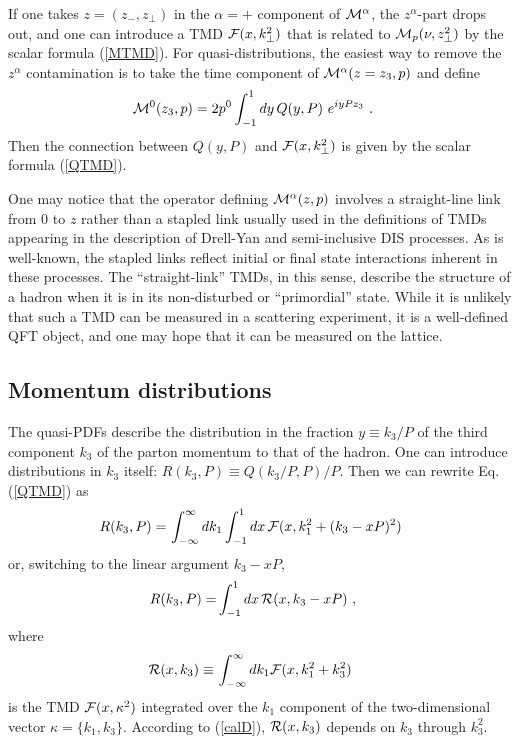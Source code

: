 \documentclass[aps,prd,twocolumn,showpacs,preprintnumbers,superscriptaddress,groupedaddress]{revtex4-1}
\begin{document}
If one takes  $z=(z_-, z_\perp)$ in the $\alpha=+$  component of 
${\cal M}^\alpha$,  the  $z^\alpha$-part drops out,  
and one can introduce a TMD  ${\cal F}(x, k_\perp^2)$  that 
is  related to  $ {\cal M}_p (\nu, z_\perp^2)$  by the scalar formula 
(\ref{MTMD}). 
For  quasi-distributions,  
the easiest way to remove   the $z^\alpha$ contamination is to take the
  time component of \mbox{$ {\cal M}^\alpha  (z=z_3,p)$}  and define
 \begin{align}
&  {\cal M}^0   (z_3,p)   
  =  2p^0 
 \int_{-1}^1 dy\,  
Q(y,P) \, 
 \,  e^{i  y Pz_3 }  \  . 
 \label{OPhixspin12}
\end{align} 
Then the  connection between $Q(y,P)$   and 
 ${\cal F}(x, k_\perp^2)$ is given 
by the scalar  formula (\ref{QTMD}). 




One may notice that  the operator  defining $ {\cal M}^\alpha  (z,p) $
involves a straight-line link from $0$ to $z$ rather than a
stapled link usually used in the definitions of TMDs appearing  in the description of
Drell-Yan and semi-inclusive DIS processes.   As is well-known, the stapled links 
reflect initial or final state interactions inherent in  these processes.
The ``straight-link'' TMDs, in this sense, describe the structure
of a hadron when   it   is in 
 its  non-disturbed or ``primordial''  state. While it is unlikely that such a TMD can be measured
 in a scattering experiment, it is a well-defined  QFT object,
 and one may hope that it can be measured on the lattice. 

 









  
 \subsection{Momentum distributions} 
 
 
  The quasi-PDFs describe the distribution in   the fraction $y \equiv k_3/P$ of the 
 third component  $k_3$ of the  parton momentum to that of the hadron. 
 One can  introduce distributions  in $k_3$ itself:
 $R (k_3,P) \equiv Q(k_3/P,P)/P$.
 Then we can rewrite Eq. (\ref{QTMD}) as
  \begin{align}
 R(k_3, P)  =  & \,\int_{-\infty}^{\infty} d  k_1
\int_{-1} ^ {1} d  x \,   {\cal F} (x, k_1^2+(k_3-xP)^2 )
  \  
 \label{RTMD0}
 \end{align} 
 or, switching to   the linear argument \mbox{$k_3-xP$,} 
   \begin{align}
 R(k_3, P)  =  &  \int_{-1}^1 dx\,   {\cal R} (x, k_3-xP)
  \  , 
 \label{RTMD}
 \end{align} 
 where
  \begin{align}
 {\cal R} (x, k_3  )   \equiv   & \,\int_{-\infty}^{\infty} d  k_1
  {\cal F} (x, k_1^2+k_3^2)
  \  
 \label{calD}
\end{align} 
is the TMD $ {\cal F} (x, \kappa^2)$  integrated over the $k_1$   component
of 
the  two-dimensional  vector $\kappa=\{k_1,k_3\}$. 
According to (\ref{calD}),  ${\cal R} (x, k_3  ) $ depends on $k_3$ through $k_3^2$. 
\end{document}

